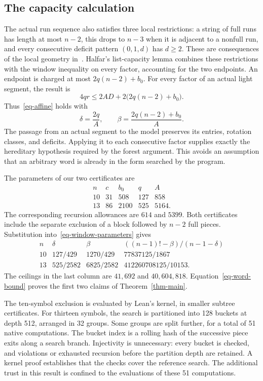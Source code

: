 \documentclass[11pt]{article}
\begin{document}
\subsection{The capacity calculation}
The actual run sequence also satisfies three local restrictions: a string
of full runs has length at most $n-2$, this drops to $n-3$ when it is
adjacent to a nonfull run, and every consecutive deficit pattern
$(0,1,d)$ has $d\ge2$. These are consequences of the local geometry
in~\cite{framework}. Halfar's list-capacity lemma combines these
restrictions with the window inequality on every factor, accounting
for the two endpoints. An endpoint is charged at most $2q(n-2)+b_0$. For every factor of
an actual light segment, the result is
\[
 4qr\le2AD+2\bigl(2q(n-2)+b_0\bigr).
\]
Thus~\eqref{eq-affine} holds with
\begin{equation}\label{eq-window-parameters}
 \delta=\frac{2q}{A},\qquad
 \beta=\frac{2q(n-2)+b_0}{A}.
\end{equation}
The passage from an actual segment to the model preserves its entries,
rotation classes, and deficits. Applying it to each consecutive factor
supplies exactly the hereditary hypothesis required by the forest
argument. This avoids an assumption that an arbitrary word is already
in the form searched by the program.

The parameters of our two certificates are
\[
\begin{array}{c|rrrr}
 n&c&b_0&q&A\\ \hline
 10&31&508&127&858\\
 13&86&2100&525&5164.
\end{array}
\]
The corresponding recursion allowances are $614$ and $5399$. Both
certificates include the separate exclusion of a block followed by
$n-2$ full pieces. Substitution into~\eqref{eq-window-parameters} gives
\[
\begin{array}{c|ccc}
 n&\delta&\beta&((n-1)!-\beta)/(n-1-\delta)\\ \hline
 10&127/429&1270/429&77837125/1867\\
 13&525/2582&6825/2582&412260708125/10153.
\end{array}
\]
The ceilings in the last column are $41{,}692$ and $40{,}604{,}818$.
Equation~\eqref{eq-word-bound} proves the first two claims of
Theorem~\ref{thm-main}.

The ten-symbol exclusion is evaluated by Lean's kernel, in smaller
subtree certificates. For thirteen symbols, the search is partitioned
into 128 buckets at depth 512, arranged in 32 groups. Some groups are
split further, for a total of 51 native computations. The bucket index
is a rolling hash of the successive piece exits along a search branch. Injectivity is unnecessary:
every bucket is checked, and violations or exhausted recursion before
the partition depth are retained. A kernel proof establishes that the
checks cover the reference search. The additional trust in this result
is confined to the evaluations of these 51 computations.
\end{document}

